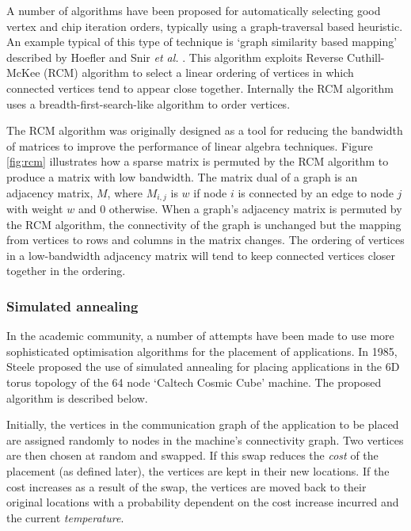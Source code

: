 				A number of algorithms have been proposed for automatically selecting
				good vertex and chip iteration orders, typically using a
				graph-traversal based heuristic. An example typical of this type of
				technique is `graph similarity based mapping' described by Hoefler and
				Snir \emph{et al.} \cite{hoefler11}. This algorithm exploits Reverse
				Cuthill-McKee (RCM) algorithm \cite{cuthill69} to select a linear
				ordering of vertices in which connected vertices tend to appear close
				together. Internally the RCM algorithm uses a breadth-first-search-like
				algorithm to order vertices.
				
				The RCM algorithm was originally designed as a tool for reducing the
				bandwidth of matrices to improve the performance of linear algebra
				techniques. Figure \ref{fig:rcm} illustrates how a sparse matrix is
				permuted by the RCM algorithm to produce a matrix with low bandwidth.
				The matrix dual of a graph is an adjacency matrix, $M$, where $M_{i,j}$
				is $w$ if node $i$ is connected by an edge to node $j$ with weight $w$
				and 0 otherwise. When a graph's adjacency matrix is permuted by the RCM
				algorithm, the connectivity of the graph is unchanged but the mapping
				from vertices to rows and columns in the matrix changes. The ordering
				of vertices in a low-bandwidth adjacency matrix will tend to keep
				connected vertices closer together in the ordering.
				
			\subsubsection{Simulated annealing}
				
				In the academic community, a number of attempts have been made to use
				more sophisticated optimisation algorithms for the placement of
				applications. In 1985, Steele \cite{steele85} proposed the use of
				simulated annealing for placing applications in the 6D torus topology
				of the 64 node `Caltech Cosmic Cube' machine. The proposed algorithm is
				described below.
				
				Initially, the vertices in the communication graph of the application
				to be placed are assigned randomly to nodes in the machine's
				connectivity graph. Two vertices are then chosen at random and swapped.
				If this swap reduces the \emph{cost} of the placement (as defined
				later), the vertices are kept in their new locations. If the cost
				increases as a result of the swap, the vertices are moved back to their
				original locations with a probability dependent on the cost increase
				incurred and the current \emph{temperature}.
				
